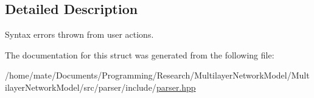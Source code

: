 \subsection{Detailed Description}
Syntax errors thrown from user actions. 

The documentation for this struct was generated from the following file\+:\begin{DoxyCompactItemize}
\item 
/home/mate/\+Documents/\+Programming/\+Research/\+Multilayer\+Network\+Model/\+Multilayer\+Network\+Model/src/parser/include/\hyperlink{parser_8hpp}{parser.\+hpp}\end{DoxyCompactItemize}

